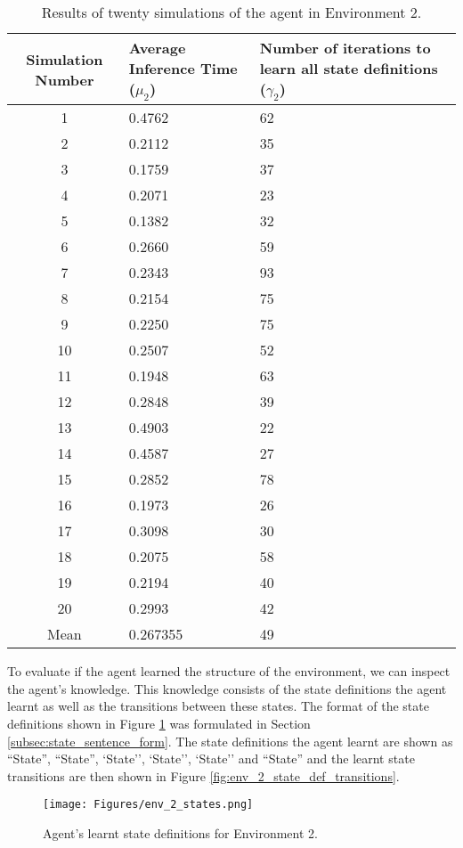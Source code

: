\begin{table}[H]
\begin{tabular}{ |c|p{5cm}|p{5cm}| }
\hline
	Simulation Number & Average Inference Time ($\mu_2$) & Number of iterations to learn all state definitions ($\gamma_2$) \\ \hline
  1 & 0.4762 & 62 \\
  2 & 0.2112 & 35 \\
  3 & 0.1759 & 37 \\
  4 & 0.2071 & 23 \\
  5 & 0.1382 & 32 \\
  6 & 0.2660 & 59 \\
  7 & 0.2343 & 93 \\
  8 & 0.2154 & 75 \\
  9 & 0.2250 & 75 \\
  10 & 0.2507 & 52 \\
  11 & 0.1948 & 63 \\
  12 & 0.2848 & 39 \\
  13 & 0.4903 & 22 \\
  14 & 0.4587 & 27 \\
  15 & 0.2852 & 78 \\
  16 & 0.1973 & 26 \\
  17 & 0.3098 & 30 \\
  18 & 0.2075 & 58 \\
  19 & 0.2194 & 40 \\
  20 & 0.2993 & 42 \\
  \hline
  Mean & 0.267355 & 49\\
	\hline  
\end{tabular}
\caption{Results of twenty simulations of the agent in Environment 2.}
\label{table:20_sim_env_2}
\end{table}


To evaluate if the agent learned the structure of the environment, we can inspect the agent's knowledge. This knowledge consists of the state definitions the agent learnt as well as the transitions between these states. The format of the state definitions shown in Figure \ref{fig:env_2_state_defs} was formulated in Section \ref{subsec:state_sentence_form}. The state definitions the agent learnt are shown as ``State'', ``State'', `State'', `State'', `State'' and ``State'' and the learnt state transitions are then shown in Figure \ref{fig:env_2_state_def_transitions}.


\begin{figure}[H]
    \centering
    \texttt{[image: Figures/env\_2\_states.png]}
    \caption{Agent's learnt state definitions for Environment 2.}
    \label{fig:env_2_state_defs}
\end{figure}

